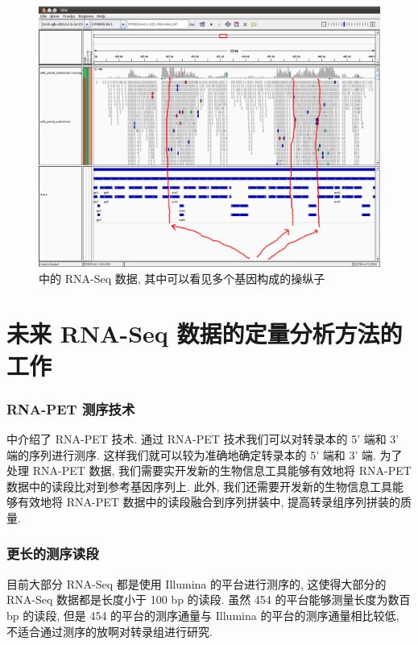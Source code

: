 \begin{figure}[!t]
\centering
\includegraphics[width=\textwidth]{figures/disc/disc-bacteria-operons-1.png}
\caption{ 中的 RNA-Seq 数据, 
其中可以看见多个基因构成的操纵子}
\label{disc-bacteria-operons-1}
\end{figure}

\section{未来 RNA-Seq 数据的定量分析方法的工作}

\subsubsection{RNA-PET 测序技术} %
 中介绍了 RNA-PET 技术. 
通过 RNA-PET 技术我们可以对转录本的 5' 端和 3' 端的序列进行测序. 
这样我们就可以较为准确地确定转录本的 5' 端和 3' 端. 
为了处理 RNA-PET 数据, 我们需要实开发新的生物信息工具能够有效地将 RNA-PET 
数据中的读段比对到参考基因序列上. 此外, 我们还需要开发新的生物信息工具能够有效地将 RNA-PET 
数据中的读段融合到序列拼装中, 提高转录组序列拼装的质量. 

\subsubsection{更长的测序读段} %
目前大部分 RNA-Seq 都是使用 Illumina 的平台进行测序的, 
这使得大部分的 RNA-Seq 数据都是长度小于 100 bp 的读段. 
虽然 454 的平台能够测量长度为数百 bp 的读段, 
但是 454 的平台的测序通量与 Illumina 的平台的测序通量相比较低, 
不适合通过测序的放啊对转录组进行研究. 

